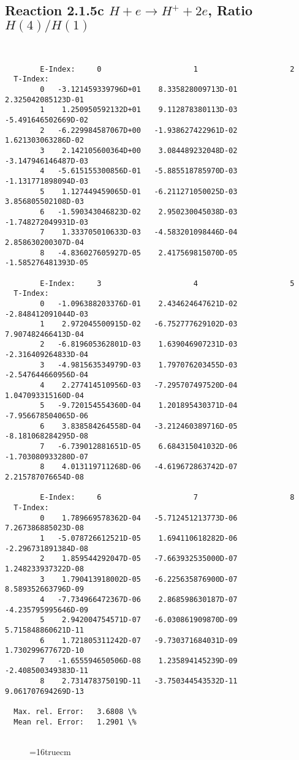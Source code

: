 \documentclass[12pt,dvipdfmx]{article}
\begin{document}
\newpage
\subsection{
Reaction 2.1.5c  $H + e \rightarrow H^+ + 2e$, Ratio $H(4)/H(1)$
}


\begin{small}\begin{verbatim}


        E-Index:     0                     1                     2
  T-Index:
        0   -3.121459339796D+01    8.335828009713D-01    2.325042085123D-01
        1    1.250950592132D+01    9.112878380113D-03   -5.491646502669D-02
        2   -6.229984587067D+00   -1.938627422961D-02    1.621303063286D-02
        3    2.142105600364D+00    3.084489232048D-02   -3.147946146487D-03
        4   -5.615155300856D-01   -5.885518785970D-03   -1.131771898094D-03
        5    1.127449459065D-01   -6.211271050025D-03    3.856805502108D-03
        6   -1.590343046823D-02    2.950230045038D-03   -1.748272049931D-03
        7    1.333705010633D-03   -4.583201098446D-04    2.858630200307D-04
        8   -4.836027605927D-05    2.417569815070D-05   -1.585276481393D-05

        E-Index:     3                     4                     5
  T-Index:
        0   -1.096388203376D-01    2.434624647621D-02   -2.848412091044D-03
        1    2.972045500915D-02   -6.752777629102D-03    7.907482466413D-04
        2   -6.819605362801D-03    1.639046907231D-03   -2.316409264833D-04
        3   -4.981563534979D-03    1.797076203455D-03   -2.547644660956D-04
        4    2.277414510956D-03   -7.295707497520D-04    1.047093315160D-04
        5   -9.720154554360D-04    1.201895430371D-04   -7.956678504065D-06
        6    3.838584264558D-04   -3.212460389716D-05   -8.181068284295D-08
        7   -6.739012881651D-05    6.684315041032D-06   -1.703080933280D-07
        8    4.013119711268D-06   -4.619672863742D-07    2.215787076654D-08

        E-Index:     6                     7                     8
  T-Index:
        0    1.789669578362D-04   -5.712451213773D-06    7.267386885023D-08
        1   -5.078726612521D-05    1.694110618282D-06   -2.296731891384D-08
        2    1.859544292047D-05   -7.663932535000D-07    1.248233937322D-08
        3    1.790413918002D-05   -6.225635876900D-07    8.589352663796D-09
        4   -7.734966472367D-06    2.868598630187D-07   -4.235795995646D-09
        5    2.942004754571D-07   -6.030861909870D-09    5.715848860621D-11
        6    1.721805311242D-07   -9.730371684031D-09    1.730299677672D-10
        7   -1.655594650506D-08    1.235894145239D-09   -2.408500349383D-11
        8    2.731478375019D-11   -3.750344543532D-11    9.061707694269D-13

  Max. rel. Error:   3.6808 \%
  Mean rel. Error:   1.2901 \%


\end{verbatim}\end{small}
\begin{figure} \label{2.1.5c}
\epsfxsize=16truecm
\end{figure}
\end{document}
